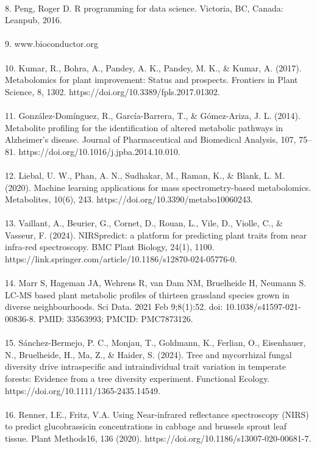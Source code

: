 \documentclass[12pt,a4paper]{report}
\begin{document}
\\
8. Peng, Roger D. R programming for data science. Victoria, BC, Canada: Leanpub, 2016. \\
\\
9. www.bioconductor.org \\
\\
10. Kumar, R., Bohra, A., Pandey, A. K., Pandey, M. K., \& Kumar, A. (2017). Metabolomics for plant improvement: Status and prospects. Frontiers in Plant Science, 8, 1302. https://doi.org/10.3389/fpls.2017.01302. \\
\\
11. González-Domínguez, R., García-Barrera, T., \& Gómez-Ariza, J. L. (2014). Metabolite profiling for the identification of altered metabolic pathways in Alzheimer's disease. Journal of Pharmaceutical and Biomedical Analysis, 107, 75–81. https://doi.org/10.1016/j.jpba.2014.10.010. \\
\\
12. Liebal, U. W., Phan, A. N., Sudhakar, M., Raman, K., \& Blank, L. M. (2020). Machine learning applications for mass spectrometry-based metabolomics. Metabolites, 10(6), 243. https://doi.org/10.3390/metabo10060243. \\
\\
13. Vaillant, A., Beurier, G., Cornet, D., Rouan, L., Vile, D., Violle, C., \& Vasseur, F. (2024). NIRSpredict: a platform for predicting plant traits from near infra-red spectroscopy. BMC Plant Biology, 24(1), 1100. https://link.springer.com/article/10.1186/s12870-024-05776-0. \\
\\
14. Marr S, Hageman JA, Wehrens R, van Dam NM, Bruelheide H, Neumann S. LC-MS based plant metabolic profiles of thirteen grassland species grown in diverse neighbourhoods. Sci Data. 2021 Feb 9;8(1):52. doi: 10.1038/s41597-021-00836-8. PMID: 33563993; PMCID: PMC7873126. \\
\\
15. Sánchez-Bermejo, P. C., Monjau, T., Goldmann, K., Ferlian, O., Eisenhauer, N., Bruelheide, H., Ma, Z., \& Haider, S. (2024). Tree and mycorrhizal fungal diversity drive intraspecific and intraindividual trait variation in temperate forests: Evidence from a tree diversity experiment. Functional Ecology. https://doi.org/10.1111/1365-2435.14549. \\
\\
16. Renner, I.E., Fritz, V.A. Using Near-infrared reflectance spectroscopy (NIRS) to predict glucobrassicin concentrations in cabbage and brussels sprout leaf tissue. Plant Methods16, 136 (2020). https://doi.org/10.1186/s13007-020-00681-7. \\
\end{document}

